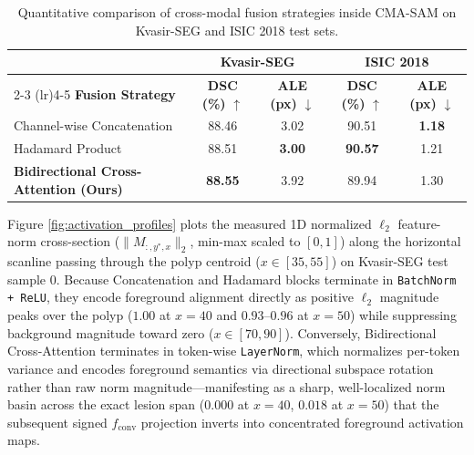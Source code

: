 \documentclass[onecolumn]{IEEEtran}
\numberwithin{equation}{section}
\theoremstyle{definition}
\theoremstyle{remark}
\begin{document}
\begin{table}[!htbp]
\centering
\caption{Quantitative comparison of cross-modal fusion strategies inside CMA-SAM on Kvasir-SEG and ISIC 2018 test sets.}
\label{tab:fusion_strategies}
\begin{tabularx}{\linewidth}{@{}Xcccc@{}}
\toprule
 & \multicolumn{2}{c}{\textbf{Kvasir-SEG \cite{jha2020kvasir}}} & \multicolumn{2}{c}{\textbf{ISIC 2018 \cite{codella2018skin}}} \\
\cmidrule(lr){2-3} \cmidrule(lr){4-5}
\textbf{Fusion Strategy} & \textbf{DSC (\%)} $\uparrow$ & \textbf{ALE (px)} $\downarrow$ & \textbf{DSC (\%)} $\uparrow$ & \textbf{ALE (px)} $\downarrow$ \\
\midrule
Channel-wise Concatenation & 88.46 & 3.02 & 90.51 & \textbf{1.18} \\
Hadamard Product \cite{lin2023multi} & 88.51 & \textbf{3.00} & \textbf{90.57} & 1.21 \\
\textbf{Bidirectional Cross-Attention (Ours)} & \textbf{88.55} & 3.92 & 89.94 & 1.30 \\
\bottomrule
\end{tabularx}
\end{table}

Figure \ref{fig:activation_profiles} plots the measured 1D normalized $\ell_2$ feature-norm cross-section ($\|M_{:, y^*, x}\|_2$, min-max scaled to $[0, 1]$) along the horizontal scanline passing through the polyp centroid ($x \in [35, 55]$) on Kvasir-SEG test sample $0$. Because Concatenation and Hadamard blocks terminate in \texttt{BatchNorm + ReLU}, they encode foreground alignment directly as positive $\ell_2$ magnitude peaks over the polyp ($1.00$ at $x=40$ and $0.93$--$0.96$ at $x=50$) while suppressing background magnitude toward zero ($x \in [70, 90]$). Conversely, Bidirectional Cross-Attention terminates in token-wise \texttt{LayerNorm}, which normalizes per-token variance and encodes foreground semantics via directional subspace rotation rather than raw norm magnitude—manifesting as a sharp, well-localized norm basin across the exact lesion span ($0.000$ at $x=40$, $0.018$ at $x=50$) that the subsequent signed $f_{\text{conv}}$ projection inverts into concentrated foreground activation maps.
\end{document}
